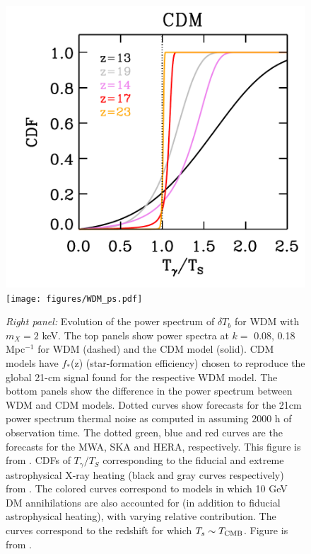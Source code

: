 \documentclass{PoS}
\begin{document}
\begin{figure}[htbp]
\begin{center}
\includegraphics[scale=0.4]{figures/THist_trim.pdf}
\texttt{[image: figures/WDM\_ps.pdf]}
\caption{{\em Right panel: }Evolution of the power spectrum of $\delta T_b$ for WDM with $m_X = 2$ keV. The top panels show power spectra at
$k =$ 0.08, 0.18 Mpc$^{-1}$ for WDM (dashed) and the CDM model (solid). CDM models have $f_*$(z) (star-formation efficiency) chosen to reproduce the global 21-cm signal found for
the respective WDM model. The bottom panels show the difference in the power spectrum between WDM and CDM models. Dotted curves show forecasts
for the 21cm power spectrum thermal noise as computed in \cite{2014MNRAS.439.3262M} assuming 2000 h of observation time. The dotted green, blue and red curves are
the forecasts for the MWA, SKA and HERA, respectively.  This figure is from \cite{2014MNRAS.438.2664S}.
CDFs of $T_\gamma/T_S$ corresponding to the fiducial and extreme astrophysical X-ray heating (black and gray curves respectively) from \cite{2013MNRAS.431..621M}.  The colored curves correspond to models in which 10 GeV DM annihilations are also accounted for (in addition to fiducial astrophysical heating), with varying relative contribution. The curves correspond to the redshift for which $T_s \sim T_{\rm CMB}$. Figure is from \citep{2014arXiv1408.1109E}.}
\label{fig:darkmatter}
\end{center}
\end{figure}
\end{document}
